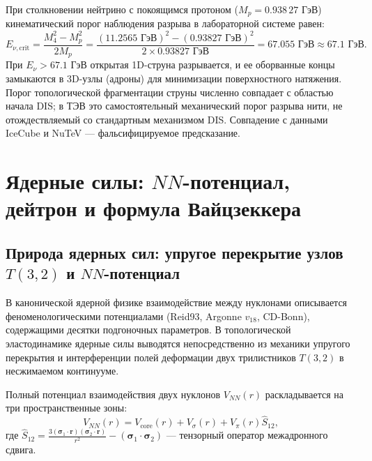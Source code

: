 \documentclass[11pt,a4paper]{article}
\theoremstyle{definition}
\theoremstyle{remark}
\begin{document}
При столкновении нейтрино с покоящимся протоном ($M_p = 0.938\,27$ ГэВ) кинематический порог наблюдения разрыва в лабораторной системе равен:
\begin{equation}
	E_{\nu, \text{crit}} = \frac{M_4^2 - M_p^2}{2 M_p} = \frac{(11.2565 \text{ ГэВ})^2 - (0.93827 \text{ ГэВ})^2}{2 \times 0.93827 \text{ ГэВ}} = \mathbf{67.055 \text{ ГэВ}} \approx \mathbf{67.1 \text{ ГэВ}}.
\end{equation}
При $E_\nu > 67.1$ ГэВ открытая 1D-струна разрывается, и ее оборванные концы замыкаются в 3D-узлы (адроны) для минимизации поверхностного натяжения. Порог топологической фрагментации струны численно совпадает с областью начала DIS; в ТЭВ это самостоятельный механический порог разрыва нити, не отождествляемый со стандартным механизмом DIS. Совпадение с данными IceCube и NuTeV — фальсифицируемое предсказание.


\section{Ядерные силы: $NN$-потенциал, дейтрон и формула Вайцзеккера}
\label{sec:nuclear}

\subsection{Природа ядерных сил: упругое перекрытие узлов $T(3,2)$ и $NN$-потенциал}
В канонической ядерной физике взаимодействие между нуклонами описывается феноменологическими потенциалами (Reid93, Argonne $v_{18}$, CD-Bonn), содержащими десятки подгоночных параметров. В топологической эластодинамике ядерные силы выводятся непосредственно из механики упругого перекрытия и интерференции полей деформации двух трилистников $T(3,2)$ в несжимаемом континууме.

Полный потенциал взаимодействия двух нуклонов $V_{NN}(r)$ раскладывается на три пространственные зоны:
\begin{equation}
    V_{NN}(r) = V_{\mathrm{core}}(r) + V_\sigma(r) + V_\pi(r) \hat{S}_{12},
    \label{eq:v_nn_structure}
\end{equation}
где $\hat{S}_{12} = \frac{3(\boldsymbol{\sigma}_1 \cdot \mathbf{r})(\boldsymbol{\sigma}_2 \cdot \mathbf{r})}{r^2} - (\boldsymbol{\sigma}_1 \cdot \boldsymbol{\sigma}_2)$ --- тензорный оператор межадронного сдвига.
\end{document}
